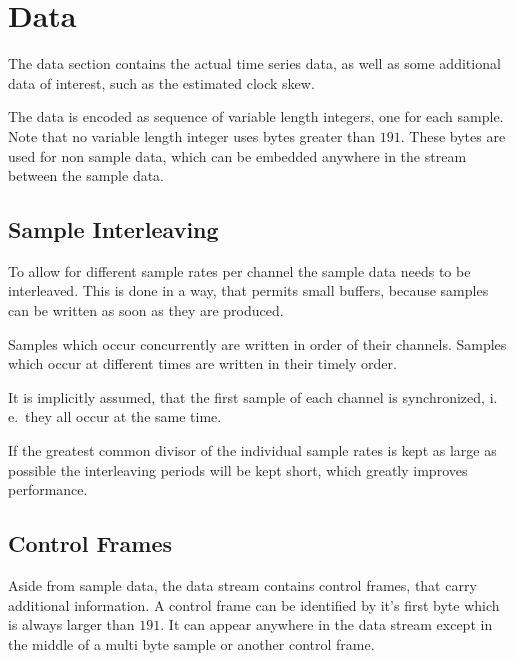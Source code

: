 \documentclass[DIV=10]{scrartcl}
\begin{document}
\section{Data}

The data section contains the actual time series data, as well as some additional data of interest, such as the estimated clock skew.

The data is encoded as sequence of variable length integers, one for each sample.
Note that no variable length integer uses bytes greater than \(191\).
These bytes are used for non sample data, which can be embedded anywhere in the stream between the sample data.

\subsection{Sample Interleaving}

To allow for different sample rates per channel the sample data needs to be interleaved.
This is done in a way, that permits small buffers, because samples can be written as soon as they are produced.

Samples which occur concurrently are written in order of their channels.
Samples which occur at different times are written in their timely order.

It is implicitly assumed, that the first sample of each channel is synchronized, i.\,e.\ they all occur at the same time.

If the greatest common divisor of the individual sample rates is kept as large as possible the interleaving periods will be kept short, which greatly improves performance.

\subsection{Control Frames}

Aside from sample data, the data stream contains control frames, that carry additional information.
A control frame can be identified by it’s first byte which is always larger than \(191\).
It can appear anywhere in the data stream except in the middle of a multi byte sample or another control frame.
\end{document}
